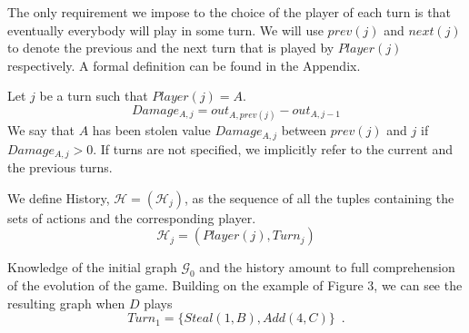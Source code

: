 \documentclass[11pt]{llncs}
\theoremstyle{definition}
\begin{document}
     The only requirement we impose to the choice of the player of each turn is that eventually everybody will play in some
     turn. We will use $prev\left(j\right)$ and $next\left(j\right)$ to denote the previous and the next turn that
     is played by $Player(j)$ respectively. A formal definition can be found in the Appendix.
     \begin{definition}[Damage]
        Let $j$ be a turn such that $Player\left(j\right) = A$.
        \begin{equation}
           Damage_{A, j} = out_{A, prev\left(j\right)} - out_{A, j-1}
        \end{equation}
        We say that $A$ has been stolen value $Damage_{A, j}$ between $prev\left(j\right)$ and $j$ if $Damage_{A, j} > 0$.
        If turns are not specified, we implicitly refer to the current and the previous turns.
     \end{definition}
     \begin{definition}[History]
        We define History, $\mathcal{H} = \left(\mathcal{H}_j\right)$, as the sequence of all the tuples containing the sets
        of actions and the corresponding player.
        \begin{equation}
           \mathcal{H}_j = \left(Player\left(j\right), Turn_j\right)
        \end{equation}
     \end{definition}
     Knowledge of the initial graph $\mathcal{G}_0$ and the history amount to full comprehension of the evolution of the
     game. Building on the example of Figure 3, we can see the resulting graph when $D$ plays
     \begin{equation}
        Turn_1 = \{Steal\left(1, B\right), Add\left(4, C\right)\} \enspace.
     \end{equation}
\end{document}
